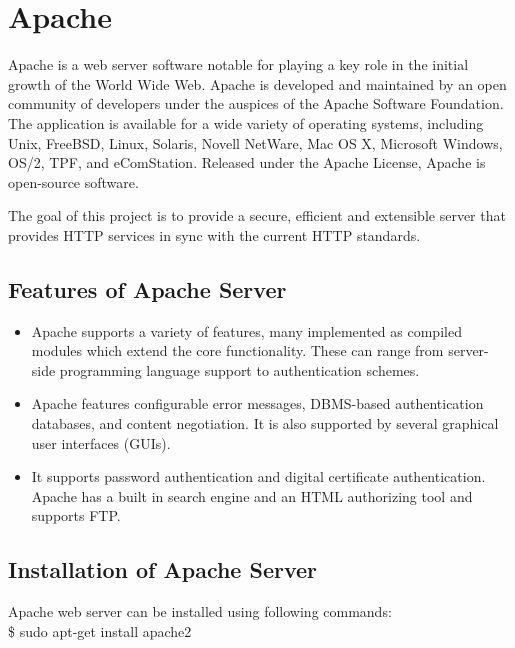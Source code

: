 \section {Apache}
\noindent Apache is a web server software notable for playing a key role in the initial 
growth of the World Wide Web. Apache is developed and maintained by an 
open community of developers under the auspices of the Apache Software 
Foundation. The application is available for a wide variety of operating 
systems, including Unix, FreeBSD, Linux, Solaris, Novell NetWare, Mac OS X, 
Microsoft Windows, OS/2, TPF, and eComStation. Released under the Apache 
License, Apache is open-source software.

\noindent The goal of this project is to provide a secure, efficient and extensible 
server that provides HTTP services in sync with the current HTTP standards.
\subsection{Features of Apache Server}
\begin{itemize}
\item Apache supports a variety of features, many implemented as compiled 
modules which extend the core functionality. These can range from 
server-side programming language support to authentication schemes. 
\item Apache features configurable error messages, DBMS-based 
authentication databases, and content negotiation. It is also supported 
by several graphical user interfaces (GUIs).
\item It supports password authentication and digital certificate 
authentication. Apache has a built in search engine and an HTML authorizing 
tool and supports FTP.
\end{itemize}

\subsection{Installation of Apache Server}
Apache web server can be installed using following commands:\\

\hspace{4pt} \$ sudo apt-get install apache2

